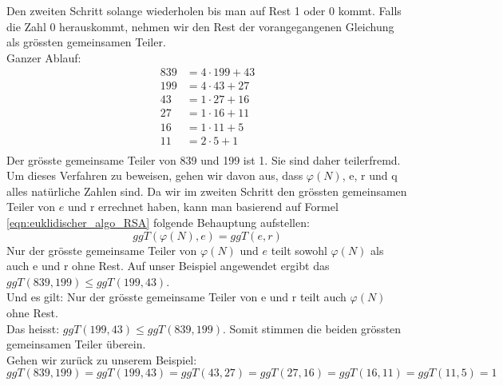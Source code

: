 Den zweiten Schritt solange wiederholen bis man auf Rest 1 oder 0 kommt. Falls die Zahl 0 herauskommt, nehmen wir den Rest der vorangegangenen Gleichung als grössten gemeinsamen Teiler.\\
%
Ganzer Ablauf:
\begin{equation*}
  \begin{split}
    839 &= 4 \cdot 199 + 43\\
    199 &= 4 \cdot 43 + 27\\
    43 &= 1 \cdot 27 + 16\\
    27 &= 1 \cdot 16 + 11\\
    16 &= 1 \cdot 11 + 5\\
    11 &= 2 \cdot 5 + 1\\
    \label{eqn:euqulid_beweis}
  \end{split}
\end{equation*}
%
Der grösste gemeinsame Teiler von 839 und 199 ist 1. Sie sind daher teilerfremd. \\[2ex]
Um dieses Verfahren zu beweisen, gehen wir davon aus, dass $\varphi(N)$, e, r und q alles natürliche  %
Zahlen sind. Da wir im zweiten Schritt den grössten gemeinsamen Teiler von $e$ und r errechnet haben, kann man basierend auf Formel \ref{eqn:euklidischer_algo_RSA} folgende Behauptung aufstellen:
%
\begin{equation}
  ggT(\varphi(N),e) = ggT(e,r)
  \label{eqn:ggT}
\end{equation}
%
Nur der grösste gemeinsame Teiler von $\varphi(N)$ und $e$ teilt sowohl $\varphi(N)$ als auch e und r ohne Rest. Auf unser Beispiel angewendet ergibt das $ggT(839,199) \leq ggT(199,43)$.\\
Und es gilt: Nur der grösste gemeinsame Teiler von e und r teilt auch $\varphi(N)$ ohne Rest.\\
Das heisst: $ggT(199,43) \leq ggT(839,199)$.
Somit stimmen die beiden grössten gemeinsamen Teiler überein\cite{zahlentheorie_fuer_einsteiger}.\\[2ex]
Gehen wir zurück zu unserem Beispiel:
%
\begin{equation*}
 ggT(839,199) = ggT(199,43) = ggT(43,27) = ggT(27,16) = ggT(16,11) = ggT(11,5) = 1
\end{equation*}
%
